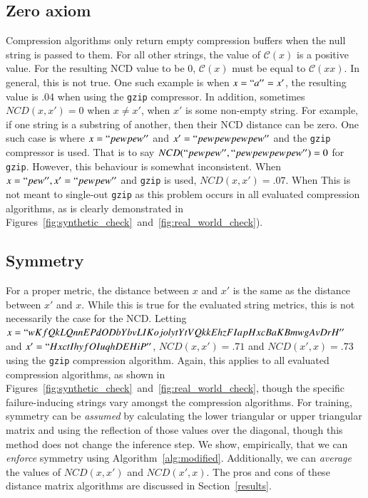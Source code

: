 \documentclass[preprint,12pt]{elsarticle}
\begin{document}
\subsection{Zero axiom} 
Compression algorithms only return empty compression buffers when the null string is passed to them. 
For all other strings, the value of $\mathcal{C}(x)$ is a positive value. 
For the resulting NCD value to be 0, $\mathcal{C}(x)$ must be equal to $\mathcal{C}(xx)$. 
In general, this is not true. 
One such example is when $x = ``a'' = x'$, the resulting value is .04 when using the \texttt{gzip} compressor.
In addition, sometimes $NCD(x,x') = 0$ when $x\neq x'$, when $x'$ is some non-empty string. 
For example, if one string is a substring of another, then their NCD distance can be zero. 
One such case is where $x = ``pewpew''$ and $x' = ``pewpewpewpew''$ and the \texttt{gzip} compressor is used. 
That is to say $NCD(``pewpew'', ``pewpewpewpew'') = 0$ for \texttt{gzip}.
However, this behaviour is somewhat inconsistent. 
When $x= ``pew'', x' =``pewpew''$ and \texttt{gzip} is used, $NCD(x,x') = .07$. 
When 
This is not meant to single-out \texttt{gzip} as this problem occurs in all evaluated compression algorithms, as is clearly demonstrated in Figures~\ref{fig:synthetic_check}~and~\ref{fig:real_world_check}).




\subsection{Symmetry} 
For a proper metric, the distance between $x$ and $x'$ is the same as the distance between $x'$ and $x$. 
While this is true for the evaluated string metrics, this is not necessarily the case for the NCD.
Letting $x = ``wKfQkLQnnEPdODbYbvLIKojolytYtVQkkEhzFIapHxcBaKBmwgAvDrH''$ and $x' = ``HxctIhyfOIuqhDEHiP''$, $NCD(x,x') = .71$ and $NCD(x',x) = .73$ using the \texttt{gzip} compression algorithm. 
Again, this applies to all evaluated compression algorithms, as shown in Figures~\ref{fig:synthetic_check}~and~\ref{fig:real_world_check}, though the specific failure-inducing strings vary amongst the compression algorithms.
For training, symmetry can be \textit{assumed} by calculating the lower triangular or upper triangular matrix and using the reflection of those values over the diagonal, though this method does not change the inference step.
We show, empirically, that we can \textit{enforce} symmetry using Algorithm~\ref{alg:modified}.
Additionally, we can \textit{average} the values of $NCD(x,x')$ and $NCD(x',x)$.
The pros and cons of these distance matrix algorithms are discussed in Section~\ref{results}.
\end{document}
